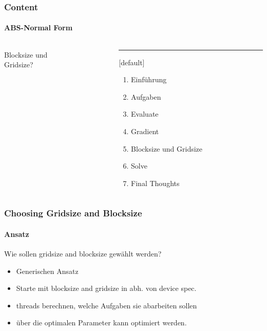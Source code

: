 \begin{frame}
	\frametitle{Content}
	\framesubtitle{ABS-Normal Form}
	\begin{columns}[T] %
		\begin{column}{.48\textwidth}
			
			\begin{center}
				{\Huge Blocksize und \\ Gridsize?}
			\end{center}
			
		\end{column}%
		\hfill%
		\begin{column}{.48\textwidth}
			\color{blue}\rule{\linewidth}{4pt}
			
			\begin{enumerate}
				\item Einführung
				\item Aufgaben
				\item Evaluate
				\item Gradient
				\item Blocksize und Gridsize
				\item Solve
				\item Final Thoughts
			\end{enumerate}
		\end{column}%
	\end{columns}
\end{frame}
\begin{frame}
	\frametitle{Choosing Gridsize and Blocksize}
	\framesubtitle{Ansatz}
	Wie sollen gridsize and blocksize gewählt werden?
	\begin{itemize}
		\item <2-> Generischen Ansatz
		\item <3-> Starte mit blocksize and gridsize in abh. von device spec.
		\item <4-> threads berechnen, welche Aufgaben sie abarbeiten sollen
		\item <5-> über die optimalen Parameter kann optimiert werden.
	\end{itemize}
\end{frame}
